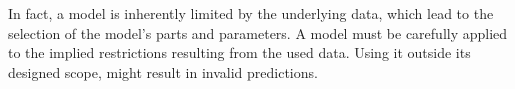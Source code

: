 
In fact, a model is inherently limited by the underlying data, which lead to the selection of the model's parts and parameters.
A model must be carefully applied to the implied restrictions resulting from the used data.
Using it outside its designed scope, might result in invalid predictions.
